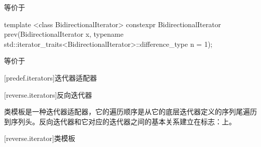\begin{itemdescr}
\pnum
\effects
等价于
\end{itemdescr}

%
\begin{itemdecl}
template <class BidirectionalIterator>
  constexpr BidirectionalIterator prev(BidirectionalIterator x,
    typename std::iterator_traits<BidirectionalIterator>::difference_type n = 1);
\end{itemdecl}

\begin{itemdescr}
\pnum
\effects
等价于
\end{itemdescr}

[predef.iterators]{迭代器适配器}

[reverse.iterators]{反向迭代器}

\pnum
类模板是一种迭代器适配器，它的遍历顺序是从它的底层迭代器定义的序列尾遍历到序列头。反向迭代器和它对应的迭代器之间的基本关系建立在标志：上。

[reverse.iterator]{类模板}

